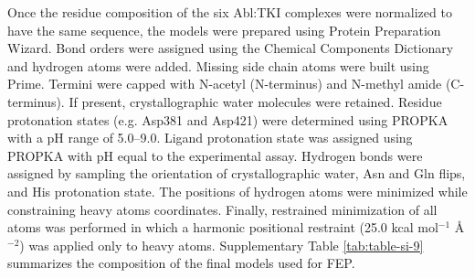 \documentclass[phd,tocprelim]{cornell}
\begin{document}
Once the residue composition of the six Abl:TKI complexes were normalized to have the same sequence, the models were prepared using Protein Preparation Wizard. Bond orders were assigned using the Chemical Components Dictionary and hydrogen atoms were added. Missing side chain atoms were built using Prime. Termini were capped with N-acetyl (N-terminus) and N-methyl amide (C-terminus). If present, crystallographic water molecules were retained. Residue protonation states (e.g. Asp381 and Asp421) were determined using PROPKA \citep{Li:ProteinsStruct.Funct.Bioinforma.:2005} with a pH range of 5.0--9.0.
Ligand protonation state was assigned using PROPKA with pH equal to the experimental assay.
Hydrogen bonds were assigned by sampling the orientation of crystallographic water, Asn and Gln flips, and His protonation state.
The positions of hydrogen atoms were minimized while constraining heavy atoms coordinates. 
Finally, restrained minimization of all atoms was performed in which a harmonic positional restraint (25.0 kcal mol$^{-1}$ {\AA}$^{-2}$) was applied only to heavy atoms. 
Supplementary Table \ref{tab:table-si-9} summarizes the composition of the final models used for FEP.
\end{document}

